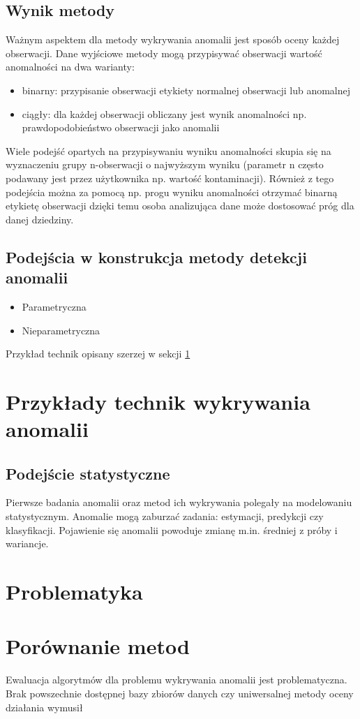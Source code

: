 \subsection{Wynik metody}
Ważnym aspektem dla metody wykrywania anomalii jest sposób oceny każdej obserwacji. Dane wyjściowe metody mogą przypisywać obserwacji wartość anomalności na dwa warianty:
\begin{itemize}
    \item binarny: przypisanie obserwacji etykiety normalnej obserwacji lub anomalnej
    \item ciągły: dla każdej obserwacji obliczany jest wynik anomalności np. prawdopodobieństwo obserwacji jako anomalii
\end{itemize}
Wiele podejść opartych na przypisywaniu wyniku anomalności skupia się na wyznaczeniu grupy n-obserwacji o najwyższym wyniku (parametr n często podawany jest przez użytkownika np. wartość kontaminacji). Również z tego podejścia można za pomocą np. progu wyniku anomalności otrzymać binarną etykietę obserwacji dzięki temu osoba analizująca dane może dostosować próg dla danej dziedziny.

\subsection{Podejścia w konstrukcja metody detekcji anomalii} 
\begin{itemize}
    \item Parametryczna
    \item Nieparametryczna
\end{itemize}
Przykład technik opisany szerzej w sekcji \ref{section:methods}

\section{Przykłady technik wykrywania anomalii}
\label{section:methods}

\subsection{Podejście statystyczne}
Pierwsze badania anomalii oraz metod ich wykrywania polegały na modelowaniu statystycznym. Anomalie mogą zaburzać zadania: estymacji, predykcji czy klasyfikacji. Pojawienie się anomalii powoduje zmianę m.in. średniej z próby i wariancje. 


\section{Problematyka}

\section{Porównanie metod}
Ewaluacja algorytmów dla problemu wykrywania anomalii jest problematyczna. Brak powszechnie dostępnej bazy zbiorów danych czy uniwersalnej metody oceny działania wymusił 